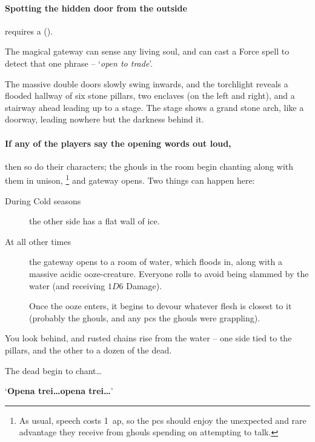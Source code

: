 \paragraph{Spotting the hidden door from the outside}
requires a  (\tn[12]).



The magical gateway can sense any living soul, and can cast a Force spell to detect that one phrase -- `\textit{open to trade}'.

\begin{boxtext}
  The massive double doors slowly swing inwards, and the torchlight reveals a flooded hallway of six stone pillars, two enclaves (on the left and right), and a stairway ahead leading up to a stage.
  The stage shows a grand stone arch, like a doorway, leading nowhere but the darkness behind it.
\end{boxtext}

\paragraph{If any of the players say the opening words out loud,}
then so do their characters; the ghouls in the room begin chanting along with them in unison,%
\footnote{As usual, speech costs 1~\gls{ap}, so the \glspl{pc} should enjoy the unexpected and rare advantage they receive from ghouls spending  on attempting to talk.}
and gateway opens.
Two things can happen here:

\begin{description}
  \item[During Cold seasons]
  the other side has a flat wall of ice.
  \item[At all other times]
  the gateway opens to a room of water, which floods in, along with a massive acidic ooze-creature.
  Everyone rolls  to avoid being slammed by the water (and receiving $1D6$ Damage).

  Once the ooze enters, it begins to devour whatever flesh is closest to it (probably the ghouls, and any \glspl{pc} the ghouls were grappling).
\end{description}


\begin{boxtext}
  You look behind, and rusted chains rise from the water -- one side tied to the pillars, and the other to a dozen of the dead.

  The dead begin to chant\ldots

  `\textbf{Opena trei\ldots opena trei\ldots}'
\end{boxtext}

